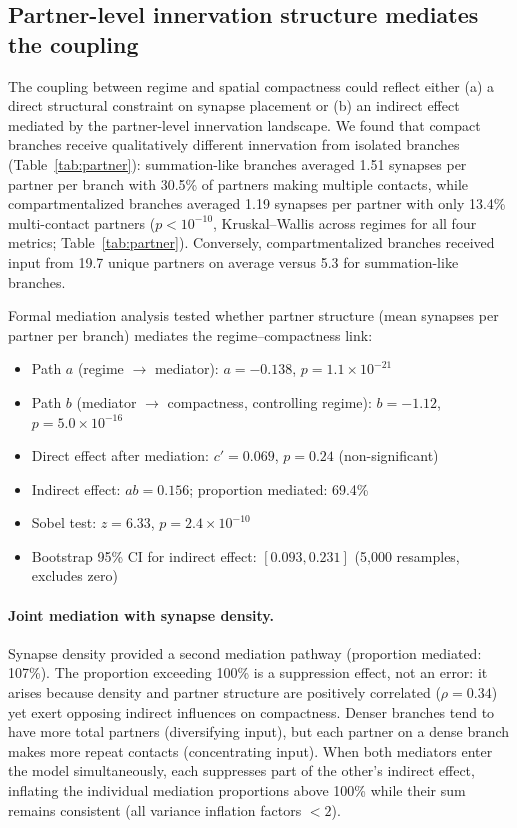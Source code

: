 \documentclass[11pt]{article}
\begin{document}
\subsection{Partner-level innervation structure mediates the coupling}

The coupling between regime and spatial compactness could reflect either (a) a direct structural constraint on synapse placement or (b) an indirect effect mediated by the partner-level innervation landscape. We found that compact branches receive qualitatively different innervation from isolated branches (Table~\ref{tab:partner}): summation-like branches averaged 1.51 synapses per partner per branch with 30.5\% of partners making multiple contacts, while compartmentalized branches averaged 1.19 synapses per partner with only 13.4\% multi-contact partners ($p < 10^{-10}$, Kruskal--Wallis across regimes for all four metrics; Table~\ref{tab:partner}). Conversely, compartmentalized branches received input from 19.7 unique partners on average versus 5.3 for summation-like branches.

Formal mediation analysis \citep{baron1986} tested whether partner structure (mean synapses per partner per branch) mediates the regime--compactness link:

\begin{itemize}
    \item Path $a$ (regime $\to$ mediator): $a = -0.138$, $p = 1.1 \times 10^{-21}$
    \item Path $b$ (mediator $\to$ compactness, controlling regime): $b = -1.12$, $p = 5.0 \times 10^{-16}$
    \item Direct effect after mediation: $c' = 0.069$, $p = 0.24$ (non-significant)
    \item Indirect effect: $ab = 0.156$; proportion mediated: 69.4\%
    \item Sobel test: $z = 6.33$, $p = 2.4 \times 10^{-10}$ \citep{sobel1982}
    \item Bootstrap 95\% CI for indirect effect: $[0.093, 0.231]$ (5,000 resamples, excludes zero)
\end{itemize}

\paragraph{Joint mediation with synapse density.}
Synapse density provided a second mediation pathway (proportion mediated: 107\%). The proportion exceeding 100\% is a suppression effect, not an error: it arises because density and partner structure are positively correlated ($\rho = 0.34$) yet exert opposing indirect influences on compactness. Denser branches tend to have more total partners (diversifying input), but each partner on a dense branch makes more repeat contacts (concentrating input). When both mediators enter the model simultaneously, each suppresses part of the other's indirect effect, inflating the individual mediation proportions above 100\% while their sum remains consistent (all variance inflation factors $< 2$).
\end{document}
